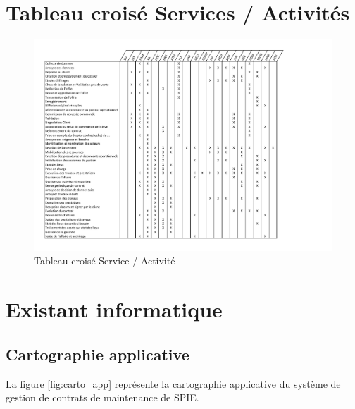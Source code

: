 \pagebreak

\section{Tableau crois\'e Services / Activit\'es}

\begin{landscape}
\begin{figure}[h]
    \centering
    \includegraphics[width=220mm]{../../pipeautage/tableau_service_activitee.pdf}
    \caption{Tableau crois\'e Service / Activit\'e}
    \label{tableau:service_activitee}
\end{figure}
\end{landscape}


\section{Existant informatique}

\subsection{Cartographie applicative}

La figure \vref{fig:carto_app} représente la cartographie applicative du système de gestion de contrats de maintenance de SPIE.


